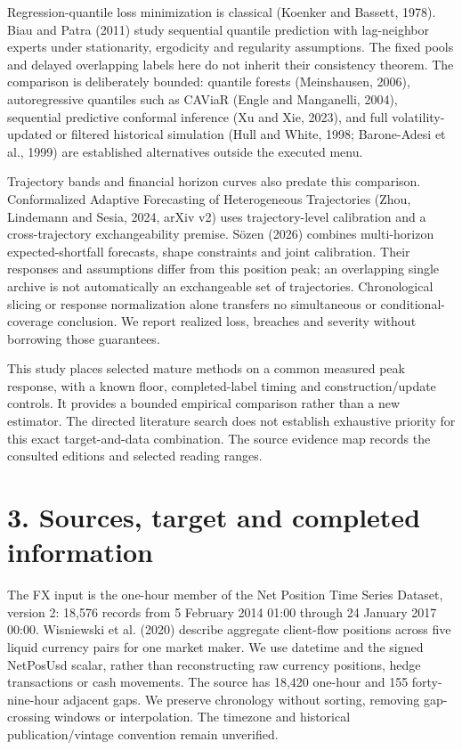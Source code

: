 \documentclass[10pt,a4paper]{article}
\begin{document}
Regression-quantile loss minimization is classical (Koenker and Bassett, 1978). Biau and Patra (2011) study sequential quantile prediction with lag-neighbor experts under stationarity, ergodicity and regularity assumptions. The fixed pools and delayed overlapping labels here do not inherit their consistency theorem. The comparison is deliberately bounded: quantile forests (Meinshausen, 2006), autoregressive quantiles such as CAViaR (Engle and Manganelli, 2004), sequential predictive conformal inference (Xu and Xie, 2023), and full volatility-updated or filtered historical simulation (Hull and White, 1998; Barone-Adesi et al., 1999) are established alternatives outside the executed menu.

Trajectory bands and financial horizon curves also predate this comparison. Conformalized Adaptive Forecasting of Heterogeneous Trajectories (Zhou, Lindemann and Sesia, 2024, arXiv v2) uses trajectory-level calibration and a cross-trajectory exchangeability premise. Sözen (2026) combines multi-horizon expected-shortfall forecasts, shape constraints and joint calibration. Their responses and assumptions differ from this position peak; an overlapping single archive is not automatically an exchangeable set of trajectories. Chronological slicing or response normalization alone transfers no simultaneous or conditional-coverage conclusion. We report realized loss, breaches and severity without borrowing those guarantees.

This study places selected mature methods on a common measured peak response, with a known floor, completed-label timing and construction/update controls. It provides a bounded empirical comparison rather than a new estimator. The directed literature search does not establish exhaustive priority for this exact target-and-data combination. The source evidence map records the consulted editions and selected reading ranges.

\section*{3. Sources, target and completed information}
The FX input is the one-hour member of the Net Position Time Series Dataset, version 2: 18,576 records from 5 February 2014 01:00 through 24 January 2017 00:00. Wisniewski et al. (2020) describe aggregate client-flow positions across five liquid currency pairs for one market maker. We use datetime and the signed NetPosUsd scalar, rather than reconstructing raw currency positions, hedge transactions or cash movements. The source has 18,420 one-hour and 155 forty-nine-hour adjacent gaps. We preserve chronology without sorting, removing gap-crossing windows or interpolation. The timezone and historical publication/vintage convention remain unverified.
\end{document}
